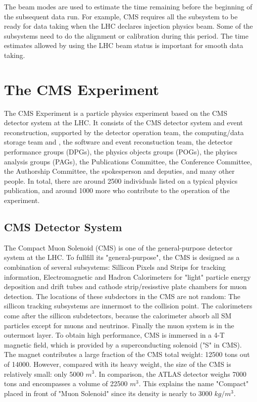The beam modes are used to estimate the time remaining before the beginning of the subsequent data run. For example, CMS requires all the subsystem to be ready for data taking when the LHC declares injection physics beam. Some of the subsystems need to do the alignment or calibration during this period. The time estimates allowed by using the LHC beam status is important for smooth data taking.

\clearpage
\section{The CMS Experiment}

The CMS Experiment is a particle physics experiment based on the CMS detector system at the LHC. It consists of the CMS detector system and event reconstruction, supported by the detector operation team, the computing/data storage team and , the software and event reconstuction team, the detector performance groups (DPGs), the physics objects groups (POGs), the phyiscs analysis groups (PAGs), the Publications Committee, the Conference Committee, the Authorship Committee, the spokesperson and deputies, and many other people.  In total, there are around 2500 individuals listed on a typical physics publication, and around 1000 more who contribute to the operation of the experiment.

\clearpage
\subsection{CMS Detector System}

The Compact Muon Solenoid (CMS) is one of the general-purpose detector system at the LHC. To fullfill its "general-purpose", the CMS is designed as a combination of several subsystems: Sillicon Pixels and Strips for tracking information, Electromagnetic and Hadron Calorimeters for "light" particle energy deposition and drift tubes and cathode strip/resisstive plate chambers for muon detection. The locations of these subdectors in the CMS are not random: The sillicon tracking subsystems are innermost to the collision point. The calorimeters come after the sillicon subdetectors, because the calorimeter absorb all SM particles except for muons and neutrinos. Finally the muon system is in the outermost layer. To obtain high performance, CMS is immersed in a 4-T magnetic field, which is provided by a superconducting solenoid ("S" in CMS). The magnet contributes a large fraction of the CMS total weight: 12500 tons out of 14000. However, compared with its heavy weight, the size of the CMS is relatively small: only 5000 $m^{3}$. In comparison, the ATLAS detector weighs 7000 tons and encompasses a volume of 22500 $m^{3}$. This explains the name "Compact" placed in front of "Muon Solenoid" since its density is nearly to 3000 $kg/m^{3}$.

